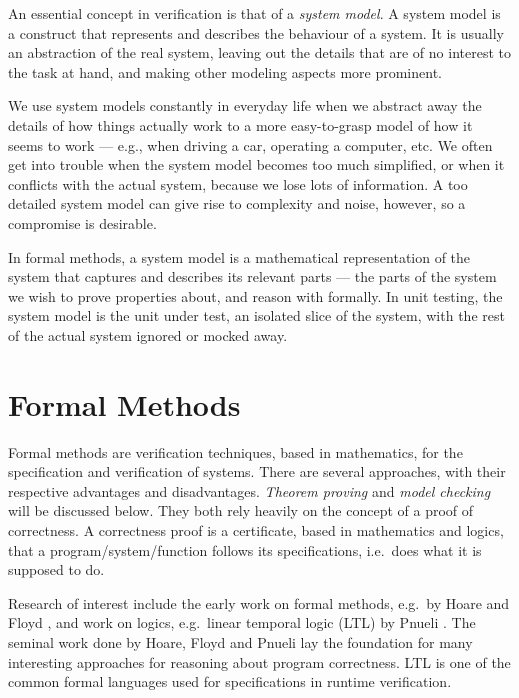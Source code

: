 An essential concept in verification is that of a \textit{system model}. A
system model is a construct that represents and describes the behaviour of a
system. It is usually an abstraction of the real system, leaving out the
details that are of no interest to the task at hand, and making other modeling
aspects more prominent.

We use system models constantly in everyday life when we abstract away the
details of how things actually work to a more easy-to-grasp model of how it
seems to work --- e.g., when driving a car, operating a computer, etc. We often
get into trouble when the system model becomes too much simplified, or when it
conflicts with the actual system, because we lose lots of information. A too
detailed system model can give rise to complexity and noise, however, so a
compromise is desirable.

In formal methods, a system model is a mathematical representation of the
system that captures and describes its relevant parts --- the parts of the
system we wish to prove properties about, and reason with formally. In unit
testing, the system model is the unit under test, an isolated slice of the
system, with the rest of the actual system ignored or mocked away.


\section{Formal Methods} \label{section-formal-methods}

Formal methods are verification techniques, based in mathematics, for the
specification and verification of systems. There are several approaches, with
their respective advantages and disadvantages. \textit{Theorem proving} and
\textit{model checking} will be discussed below. They both rely heavily on the
concept of a proof of correctness. A correctness proof is a certificate, based
in mathematics and logics, that a program/system/function follows its
specifications, i.e.\ does what it is supposed to do.

Research of interest include the early work on formal methods, e.g.\ by Hoare
\cite{hoare69} and Floyd \cite{floyd67}, and work on logics, e.g.\ linear
temporal logic (LTL) by Pnueli \cite{pnueli77}. The seminal work done by Hoare,
Floyd and Pnueli lay the foundation for many interesting approaches for
reasoning about program correctness. LTL is one of the common formal languages
used for specifications in runtime verification.

